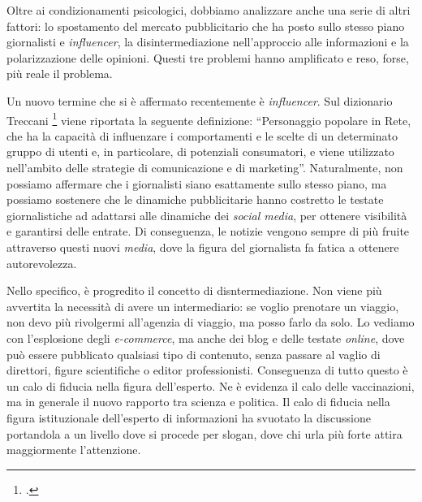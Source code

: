 \documentclass{article}
\begin{document}
 Oltre ai condizionamenti psicologici, dobbiamo analizzare anche una serie di altri fattori: lo spostamento del mercato pubblicitario che ha posto sullo stesso piano giornalisti e \textit{influencer}, la disintermediazione nell’approccio alle informazioni e la polarizzazione delle opinioni. Questi tre problemi hanno amplificato e reso, forse, più reale il problema.
 
 Un nuovo termine che si è affermato recentemente è \textit{influencer}. Sul dizionario Treccani \footcite{noauthor_influencer_nodate} viene riportata la seguente definizione: “Personaggio popolare in Rete, che ha la capacità di influenzare i comportamenti e le scelte di un determinato gruppo di utenti e, in particolare, di potenziali consumatori, e viene utilizzato nell’ambito delle strategie di comunicazione e di marketing”. Naturalmente, non possiamo affermare che i giornalisti siano esattamente sullo stesso piano, ma possiamo sostenere che le dinamiche pubblicitarie hanno costretto le testate giornalistiche ad adattarsi alle dinamiche dei \textit{social media}, per ottenere visibilità e garantirsi delle entrate. Di conseguenza, le notizie vengono sempre di più fruite attraverso questi nuovi \textit{media}, dove la figura del giornalista fa fatica a ottenere autorevolezza.
 
 Nello specifico, è progredito il concetto di disntermediazione. Non viene più avvertita la necessità di avere un intermediario: se voglio prenotare un viaggio, non devo più rivolgermi all’agenzia di viaggio, ma posso farlo da solo. Lo vediamo con l’esplosione degli \textit{e-commerce}, ma anche dei blog e delle testate \textit{online}, dove può essere pubblicato qualsiasi tipo di contenuto, senza passare al vaglio di direttori, figure scientifiche o editor professionisti. Conseguenza di tutto questo è un calo di fiducia nella figura dell’esperto. Ne è evidenza il calo delle vaccinazioni, ma in generale il nuovo rapporto tra scienza e politica. Il calo di fiducia nella figura istituzionale dell’esperto di informazioni ha svuotato la discussione portandola a un livello dove si procede per slogan, dove chi urla più forte attira maggiormente l’attenzione.
 
\end{document}
